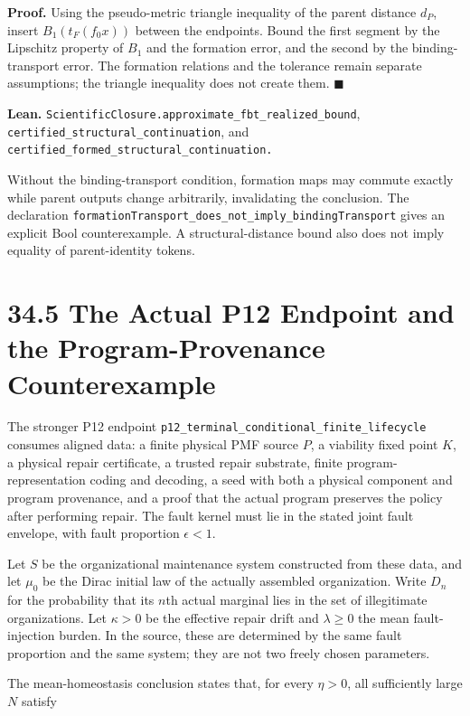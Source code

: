 \documentclass[
  english,
  11pt,
  oneside]{book}
\begin{document}
\textbf{Proof.} Using the pseudo-metric triangle inequality of the parent distance \(d_P\), insert \(B_1(t_F(f_0x))\) between the endpoints. Bound the first segment by the Lipschitz property of \(B_1\) and the formation error, and the second by the binding-transport error. The formation relations and the tolerance remain separate assumptions; the triangle inequality does not create them. \(\blacksquare\)

\textbf{Lean.} \nolinkurl{ScientificClosure.approximate_fbt_realized_bound}, \nolinkurl{certified_structural_continuation}, and \nolinkurl{certified_formed_structural_continuation.}

Without the binding-transport condition, formation maps may commute exactly while parent outputs change arbitrarily, invalidating the conclusion. The declaration \nolinkurl{formationTransport_does_not_imply_bindingTransport} gives an explicit Bool counterexample. A structural-distance bound also does not imply equality of parent-identity tokens.

\section{34.5 The Actual P12 Endpoint and the Program-Provenance Counterexample}\label{the-actual-p12-endpoint-and-the-program-provenance-counterexample}

The stronger P12 endpoint \nolinkurl{p12_terminal_conditional_finite_lifecycle} consumes aligned data: a finite physical PMF source \(P\), a viability fixed point \(K\), a physical repair certificate, a trusted repair substrate, finite program-representation coding and decoding, a seed with both a physical component and program provenance, and a proof that the actual program preserves the policy after performing repair. The fault kernel must lie in the stated joint fault envelope, with fault proportion \(\epsilon<1\).

Let \(S\) be the organizational maintenance system constructed from these data, and let \(\mu_0\) be the Dirac initial law of the actually assembled organization. Write \(D_n\) for the probability that its \(n\)th actual marginal lies in the set of illegitimate organizations. Let \(\kappa>0\) be the effective repair drift and \(\lambda\ge0\) the mean fault-injection burden. In the source, these are determined by the same fault proportion and the same system; they are not two freely chosen parameters.

The mean-homeostasis conclusion states that, for every \(\eta>0\), all sufficiently large \(N\) satisfy
\end{document}
